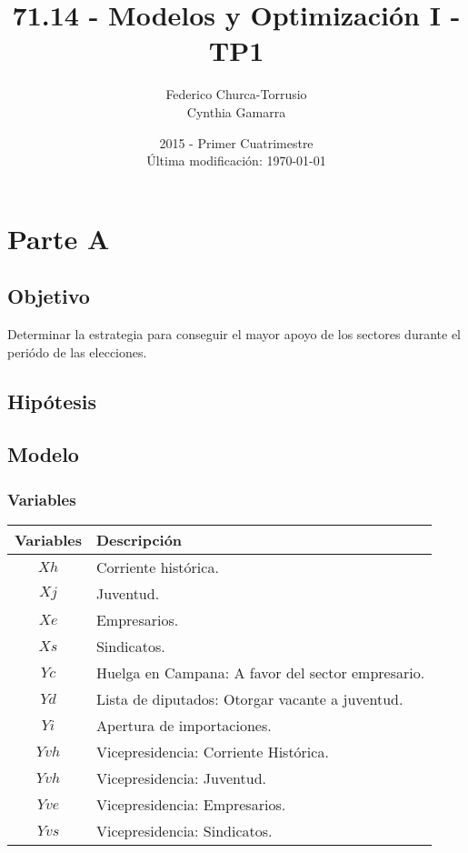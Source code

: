 \documentclass[10pt, a4paper, titlepage,
	oneside,
	fleqn, leqno]{article}
\title{71.14 - Modelos y Optimización I - TP1}
\author{
	Federico Churca-Torrusio\\
	Cynthia Gamarra}
\date{2015 - Primer Cuatrimestre\\
	Última modificación: \today}
\let\oldsection\section
\def\section{\cleardoublepage\oldsection}
\begin{document}
\maketitle
\thispagestyle{empty}
\cleardoublepage

\setcounter{page}{1}

\section{Parte A}
\subsection{Objetivo}
Determinar la estrategia para conseguir el mayor apoyo de los sectores durante el periódo de las elecciones.

\subsection{Hipótesis}
\subsection{Modelo}
\subsubsection{Variables}
\begin{table}[h!t]
  \centering
  \begin{tabular}{ | c | p{7cm} | }
    \hline
    \textbf{Variables} & \textbf{Descripción} \\ \hline
     \(Xh\)          &  Corriente histórica. \\ \hline
     \(Xj\)          & Juventud. \\ \hline
     \(Xe\)          & Empresarios. \\ \hline
     \(Xs\)          & Sindicatos. \\ \hline
     \(Yc\)          & Huelga en Campana: A favor del sector empresario. \\ \hline
     \(Yd\)          & Lista de diputados: Otorgar vacante a juventud. \\ \hline
     \(Yi\)          & Apertura de importaciones. \\ \hline
     \(Yvh\)          & Vicepresidencia: Corriente Histórica. \\ \hline
     \(Yvh\)          & Vicepresidencia: Juventud. \\ \hline
     \(Yve\)          & Vicepresidencia: Empresarios. \\ \hline
     \(Yvs\)          & Vicepresidencia: Sindicatos. \\ \hline
  \end{tabular}

\end{table}
\end{document}
